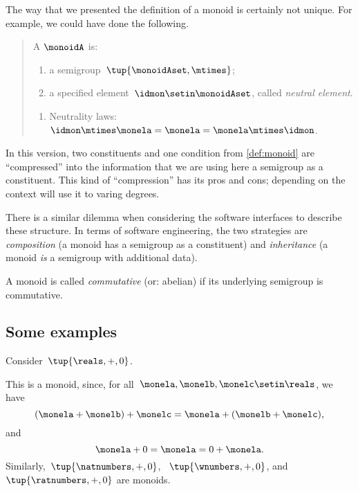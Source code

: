 \begin{remark}
    The way that we presented the definition of a monoid is certainly not unique.
    For example, we could have done the following.
    \begin{quote}
        A \emph{} $\monoidA$ is:
        \begin{body}
            \constit
            \begin{enumerate}
                \item a semigroup~$\tup{\monoidAset, \mtimes}$;
                \item a specified element~$\idmon\setin \monoidAset$, called \emph{neutral element}.
            \end{enumerate}
            \condit
            \begin{enumerate}
                \item Neutrality laws:~$\idmon\mtimes \monela= \monela= \monela \mtimes \idmon$.
            \end{enumerate}
        \end{body}
    \end{quote}
    In this version, two constituents and one condition from \cref{def:monoid} are ``compressed'' into the information that we are using here a semigroup as a constituent.
    This kind of ``compression'' has its pros and cons; depending on the context will use it to varing degrees.

    There is a similar dilemma when considering the software interfaces to describe these structure.
    In terms of software engineering, the two strategies are \emph{composition} (a monoid has a semigroup as a constituent) and \emph{inheritance} (a monoid \emph{is} a semigroup with additional data).

\end{remark}

\begin{remark}
A monoid is called \emph{commutative} (or: abelian) if its underlying semigroup is commutative.
\end{remark}

\subsection{Some examples}

\begin{example}
    Consider~$\tup{\reals,+,0}$.

    This is a monoid, since, for all~$\monela,\monelb, \monelc \setin \reals$, we have
    \begin{equation*}
        (\monela+\monelb)
        +\monelc=\monela+(\monelb+\monelc),
    \end{equation*}
    and
    \begin{equation*}
        \monela+0=\monela=0+\monela.
    \end{equation*}
    Similarly,~$\tup{\natnumbers, +,0}$, ~$\tup{\wnumbers, +,0}$, and ~$\tup{\ratnumbers, +,0}$ are monoids.
\end{example}

